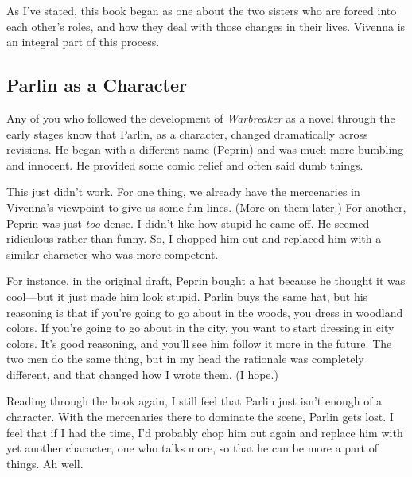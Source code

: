 As I’ve stated, this book began as one about the two sisters who are forced into each other’s roles, and how they deal with those changes in their lives. Vivenna is an integral part of this process.

\subsection*{Parlin as a Character}

Any of you who followed the development of \textit{Warbreaker} as a novel through the early stages know that Parlin, as a character, changed dramatically across revisions. He began with a different name (Peprin) and was much more bumbling and innocent. He provided some comic relief and often said dumb things.

This just didn’t work. For one thing, we already have the mercenaries in Vivenna’s viewpoint to give us some fun lines. (More on them later.) For another, Peprin was just \textit{too} dense. I didn’t like how stupid he came off. He seemed ridiculous rather than funny. So, I chopped him out and replaced him with a similar character who was more competent.

For instance, in the original draft, Peprin bought a hat because he thought it was cool—but it just made him look stupid. Parlin buys the same hat, but his reasoning is that if you’re going to go about in the woods, you dress in woodland colors. If you’re going to go about in the city, you want to start dressing in city colors. It’s good reasoning, and you’ll see him follow it more in the future. The two men do the same thing, but in my head the rationale was completely different, and that changed how I wrote them. (I hope.)

Reading through the book again, I still feel that Parlin just isn’t enough of a character. With the mercenaries there to dominate the scene, Parlin gets lost. I feel that if I had the time, I’d probably chop him out again and replace him with yet another character, one who talks more, so that he can be more a part of things. Ah well.



